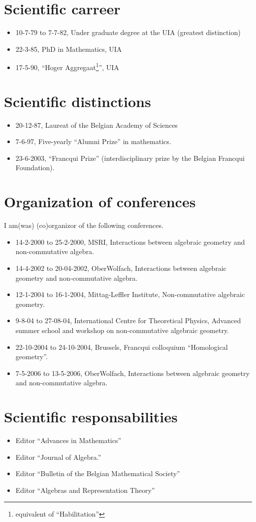 \documentclass{amsart}
\begin{document}
\section*{Scientific carreer}
\begin{itemize}
\item
10-7-79 to 7-7-82, Under graduate degree at the UIA (greatest distinction)
\item
22-3-85, PhD in Mathematics, UIA
\item
17-5-90, ``Hoger Aggregaat\footnote{equivalent of ``Habilitation''}'', UIA
\end{itemize}
\section*{Scientific distinctions}
\begin{itemize}
\item
20-12-87, Laureat of the Belgian Academy of Sciences
\item 
7-6-97, Five-yearly ``Alumni Prize'' in mathematics.
\item
23-6-2003, ``Francqui Prize'' (interdisciplinary prize by the Belgian
Francqui Foundation).
\end{itemize}
\section*{Organization of conferences}
I am(was) (co)organizor of the following conferences.
\begin{itemize}
\item 14-2-2000 to 25-2-2000, MSRI, Interactions between algebraic geometry
  and non-commutative algebra.
\item 14-4-2002 to 20-04-2002, OberWolfach, Interactions between
  algebraic geometry and non-commutative algebra. 
\item 12-1-2004 to 16-1-2004, Mittag-Leffler Institute, Non-commutative
algebraic geometry.
\item 9-8-04 to 27-08-04, International Centre for Theoretical
  Physics, Advanced summer school and workshop on non-commutative
  algebraic geometry.
\item 22-10-2004 to 24-10-2004, Brussels, Francqui colloquium 
``Homological geometry''.
\item 7-5-2006 to 13-5-2006, OberWolfach, Interactions between
  algebraic geometry and non-commutative algebra.
\end{itemize}
\section*{Scientific responsabilities}
\begin{itemize}
\item Editor ``Advances in Mathematics''
\item Editor ``Journal of Algebra.''
\item Editor ``Bulletin of the Belgian Mathematical Society''
\item Editor ``Algebras and Representation Theory''
\end{itemize}
\end{document}
